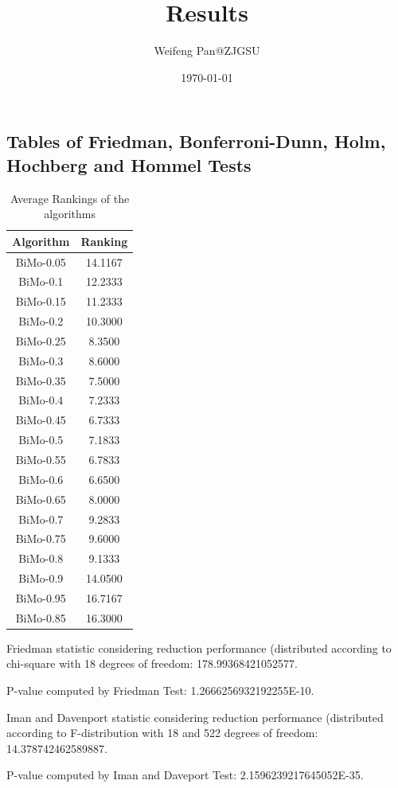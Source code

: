 \documentclass[a4paper,10pt]{article}
\title{Results}
\author{Weifeng Pan@ZJGSU}
\date{\today}
\begin{document}
\begin{landscape}
\oddsidemargin 0in \topmargin 0in\maketitle
\section{Tables of Friedman, Bonferroni-Dunn, Holm, Hochberg and Hommel Tests}
\begin{table}[!htp]
\centering
\caption{Average Rankings of the algorithms
}\begin{tabular}{c|c}
Algorithm&Ranking\\
\hline
BiMo-0.05&14.1167\\
BiMo-0.1&12.2333\\
BiMo-0.15&11.2333\\
BiMo-0.2&10.3000\\
BiMo-0.25&8.3500\\
BiMo-0.3&8.6000\\
BiMo-0.35&7.5000\\
BiMo-0.4&7.2333\\
BiMo-0.45&6.7333\\
BiMo-0.5&7.1833\\
BiMo-0.55&6.7833\\
BiMo-0.6&6.6500\\
BiMo-0.65&8.0000\\
BiMo-0.7&9.2833\\
BiMo-0.75&9.6000\\
BiMo-0.8&9.1333\\
BiMo-0.9&14.0500\\
BiMo-0.95&16.7167\\
BiMo-0.85&16.3000\\
\end{tabular}
\end{table}


Friedman statistic considering reduction performance (distributed according to chi-square with 18 degrees of freedom: 178.99368421052577.


P-value computed by Friedman Test: 1.2666256932192255E-10.\newline

Iman and Davenport statistic considering reduction performance (distributed according to F-distribution with 18 and 522 degrees of freedom: 14.378742462589887.


P-value computed by Iman and Daveport Test: 2.1596239217645052E-35.\newline


\end{landscape}
\end{document}
